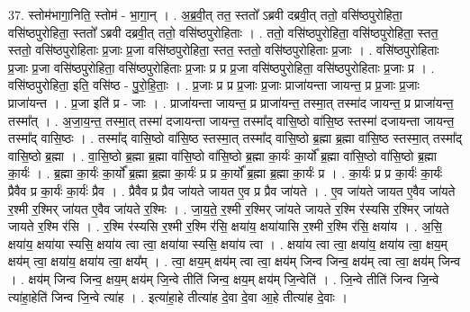 \documentclass[17pt]{extarticle}
\begin{document}
37. स्तोम॑भागा॒निति॒ स्तोम॑ - भा॒गा॒न् । . अ॒ब्र॒वी॒त् तत॒ स्ततो᳚ ऽब्रवी दब्रवी॒त् ततो॒ वसि॑ष्ठपुरोहिता॒ वसि॑ष्ठपुरोहिता॒ स्ततो᳚ ऽब्रवी दब्रवी॒त् ततो॒ वसि॑ष्ठपुरोहिताः । . ततो॒ वसि॑ष्ठपुरोहिता॒ वसि॑ष्ठपुरोहिता॒ स्तत॒ स्ततो॒ वसि॑ष्ठपुरोहिताः प्र॒जाः प्र॒जा वसि॑ष्ठपुरोहिता॒ स्तत॒ स्ततो॒ वसि॑ष्ठपुरोहिताः प्र॒जाः । . वसि॑ष्ठपुरोहिताः प्र॒जाः प्र॒जा वसि॑ष्ठपुरोहिता॒ वसि॑ष्ठपुरोहिताः प्र॒जाः प्र प्र प्र॒जा वसि॑ष्ठपुरोहिता॒ वसि॑ष्ठपुरोहिताः प्र॒जाः प्र । . वसि॑ष्ठपुरोहिता॒ इति॒ वसि॑ष्ठ - पु॒रो॒हि॒ताः॒ । . प्र॒जाः प्र प्र प्र॒जाः प्र॒जाः प्राजा॑यन्ता जायन्त॒ प्र प्र॒जाः प्र॒जाः प्राजा॑यन्त । . प्र॒जा इति॑ प्र - जाः । . प्राजा॑यन्ता जायन्त॒ प्र प्राजा॑यन्त॒ तस्मा॒त् तस्मा॑द जायन्त॒ प्र प्राजा॑यन्त॒ तस्मा᳚त् । . अ॒जा॒य॒न्त॒ तस्मा॒त् तस्मा॑ दजायन्ता जायन्त॒ तस्मा᳚द् वासि॒ष्ठो वा॑सि॒ष्ठ स्तस्मा॑ दजायन्ता जायन्त॒ तस्मा᳚द् वासि॒ष्ठः । . तस्मा᳚द् वासि॒ष्ठो वा॑सि॒ष्ठ स्तस्मा॒त् तस्मा᳚द् वासि॒ष्ठो ब्र॒ह्मा ब्र॒ह्मा वा॑सि॒ष्ठ स्तस्मा॒त् तस्मा᳚द् वासि॒ष्ठो ब्र॒ह्मा । . वा॒सि॒ष्ठो ब्र॒ह्मा ब्र॒ह्मा वा॑सि॒ष्ठो वा॑सि॒ष्ठो ब्र॒ह्मा का॒र्यः॑ का॒र्यो᳚ ब्र॒ह्मा वा॑सि॒ष्ठो वा॑सि॒ष्ठो ब्र॒ह्मा का॒र्यः॑ । . ब्र॒ह्मा का॒र्यः॑ का॒र्यो᳚ ब्र॒ह्मा ब्र॒ह्मा का॒र्यः॑ प्र प्र का॒र्यो᳚ ब्र॒ह्मा ब्र॒ह्मा का॒र्यः॑ प्र । . का॒र्यः॑ प्र प्र का॒र्यः॑ का॒र्यः॑ प्रैवैव प्र का॒र्यः॑ का॒र्यः॑ प्रैव । . प्रैवैव प्र प्रैव जा॑यते जायत ए॒व प्र प्रैव जा॑यते । . ए॒व जा॑यते जायत ए॒वैव जा॑यते र॒श्मी र॒श्मिर् जा॑यत ए॒वैव जा॑यते र॒श्मिः । . जा॒य॒ते॒ र॒श्मी र॒श्मिर् जा॑यते जायते र॒श्मि र॑स्यसि र॒श्मिर् जा॑यते जायते र॒श्मि र॑सि । . र॒श्मि र॑स्यसि र॒श्मी र॒श्मि र॑सि॒ क्षया॑य॒ क्षया॑यासि र॒श्मी र॒श्मि र॑सि॒ क्षया॑य । . अ॒सि॒ क्षया॑य॒ क्षया॑या स्यसि॒ क्षया॑य त्वा त्वा॒ क्षया॑या स्यसि॒ क्षया॑य त्वा । . क्षया॑य त्वा त्वा॒ क्षया॑य॒ क्षया॑य त्वा॒ क्षय॒म् क्षय॑म् त्वा॒ क्षया॑य॒ क्षया॑य त्वा॒ क्षय᳚म् । . त्वा॒ क्षय॒म् क्षय॑म् त्वा त्वा॒ क्षय॑म् जिन्व जिन्व॒ क्षय॑म् त्वा त्वा॒ क्षय॑म् जिन्व । . क्षय॑म् जिन्व जिन्व॒ क्षय॒म् क्षय॑म् जि॒न्वे तीति॑ जिन्व॒ क्षय॒म् क्षय॑म् जि॒न्वेति॑ । . जि॒न्वे तीति॑ जिन्व जि॒न्वे त्या॑हा॒हेति॑ जिन्व जि॒न्वे त्या॑ह । . इत्या॑हा॒हे तीत्या॑ह दे॒वा दे॒वा आ॒हे तीत्या॑ह दे॒वाः । \newline
\pagebreak
{}
\end{document}
